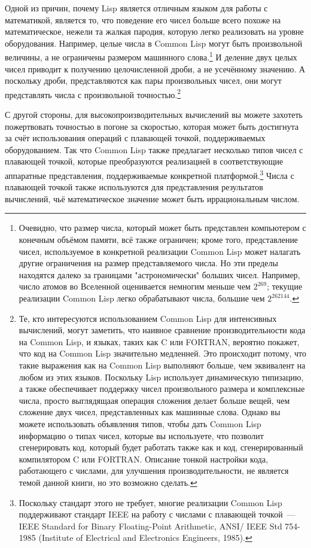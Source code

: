 Одной из причин, почему Lisp является отличным языком для работы с математикой, является
то, что поведение его чисел больше всего похоже на математическое, нежели та жалкая
пародия, которую легко реализовать на уровне оборудования.  Например, целые числа в Common
Lisp могут быть произвольной величины, а не ограничены размером машинного
слова.\footnote{Очевидно, что размер числа, который может быть представлен компьютером с
  конечным объёмом памяти, всё также ограничен; кроме того, представление чисел,
  используемое в конкретной реализации Common Lisp может налагать другие ограничения на
  размер представляемого числа.  Но эти пределы находятся далеко за границами
  "астрономически" больших чисел.  Например, число атомов во Вселенной оценивается
  немногим меньше чем $2^{269}$; текущие реализации Common Lisp легко обрабатывают числа,
  большие чем $2^{262144}$.}  И деление двух целых чисел приводит к получению
целочисленной дроби, а не усечённому значению.  А поскольку дроби, представляются как пары
произвольных чисел, они могут представлять числа с произвольной точностью.\footnote{Те,
  кто интересуются использованием Common Lisp для интенсивных вычислений, могут заметить,
  что наивное сравнение производительности кода на Common Lisp, и языках, таких как C или
  FORTRAN, вероятно покажет, что код на Common Lisp значительно медленней.  Это происходит
  потому, что такие выражения как  на Common Lisp выполняют больше, чем
  эквивалент  на любом из этих языков.  Поскольку Lisp использует динамическую
  типизацию, а также обеспечивает поддержку чисел произвольного размера и комплексные
  числа, просто выглядящаая операция сложения делает больше вещей, чем сложение двух
  чисел, представленных как машинные слова.  Однако вы можете использовать объявления
  типов, чтобы дать Common Lisp информацию о типах чисел, которые вы используете, что
  позволит сгенерировать код, который будет работать также как и код, сгенерированный
  компилятором C или FORTRAN.  Описание тонкой настройки кода, работающего с числами, для
  улучшения производительности, не является темой данной книги, но это возможно сделать.}

С другой стороны, для высокопроизводительных вычислений вы можете захотеть пожертвовать
точностью в погоне за скоростью, которая может быть достигнута за счёт использования
операций с плавающей точкой, поддерживаемых оборудованием.  Так что Common Lisp также
предлагает несколько типов чисел с плавающей точкой, которые преобразуются реализацией в
соответствующие аппаратные представления, поддерживаемые конкретной
платформой.\footnote{Поскольку стандарт этого не требует, многие реализации Common Lisp
  поддерживают стандарт IEEE на работу с числами с плавающей точкой~--- IEEE Standard for
  Binary Floating-Point Arithmetic, ANSI/ IEEE Std 754-1985 (Institute of Electrical and
  Electronics Engineers, 1985).}  Числа с плавающей точкой также используются для
представления результатов вычислений, чьё математическое значение может быть
иррациональным числом.

